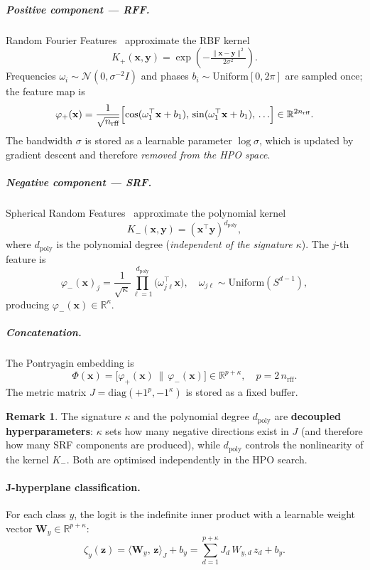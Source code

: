 \documentclass[12pt,a4paper]{article}
\newcommand{\R}{\mathbb{R}}
\newcommand{\kap}{\kappa}
\newcommand{\Jprod}[2]{\langle #1,\, #2 \rangle_J}
\newcommand{\phipos}{\varphi_+}
\newcommand{\phineg}{\varphi_-}
\newcommand{\dpoly}{d_{\mathrm{poly}}}
\theoremstyle{definition}
\newtheorem{remark}{Remark}
\begin{document}
\subparagraph{Positive component — RFF.}
Random Fourier Features~\cite{rahimi2007} approximate the RBF kernel
\[
  K_+(\mathbf{x}, \mathbf{y}) = \exp\!\left(-\tfrac{\|\mathbf{x}-\mathbf{y}\|^2}{2\sigma^2}\right).
\]
Frequencies $\omega_i \sim \mathcal{N}(0, \sigma^{-2} I)$ and phases
$b_i \sim \mathrm{Uniform}[0, 2\pi]$ are sampled once; the feature map is
\[
  \phipos(\mathbf{x}) = \frac{1}{\sqrt{n_{\text{rff}}}}
  \Bigl[\cos(\omega_1^\top \mathbf{x} + b_1),\, \sin(\omega_1^\top \mathbf{x} + b_1),\,
        \ldots\Bigr]
  \in \R^{2 n_{\text{rff}}}.
\]
The bandwidth $\sigma$ is stored as a learnable parameter $\log\sigma$, which
is updated by gradient descent and therefore \emph{removed from the HPO
space}.

\subparagraph{Negative component — SRF.}
Spherical Random Features~\cite{pennington2015} approximate the polynomial
kernel
\[
  K_-(\mathbf{x}, \mathbf{y}) = (\mathbf{x}^\top \mathbf{y})^{\dpoly},
\]
where $\dpoly$ is the polynomial degree (\emph{independent of the signature
$\kap$}).  The $j$-th feature is
\[
  \phineg(\mathbf{x})_j = \frac{1}{\sqrt{\kap}}
  \prod_{\ell=1}^{\dpoly} \bigl(\omega_{j\ell}^\top \mathbf{x}\bigr),
  \quad
  \omega_{j\ell} \sim \mathrm{Uniform}(S^{d-1}),
\]
producing $\phineg(\mathbf{x}) \in \R^\kap$.

\subparagraph{Concatenation.}
The Pontryagin embedding is
\[
  \Phi(\mathbf{x})
  = \bigl[\phipos(\mathbf{x})\,\|\,\phineg(\mathbf{x})\bigr]
  \in \R^{p + \kap},
  \quad p = 2\,n_{\text{rff}}.
\]
The metric matrix $J = \mathrm{diag}(+1^p, -1^\kap)$ is stored as a fixed
buffer.

\begin{remark}
  The signature $\kap$ and the polynomial degree $\dpoly$ are
  \textbf{decoupled hyperparameters}: $\kap$ sets how many negative
  directions exist in $J$ (and therefore how many SRF components are
  produced), while $\dpoly$ controls the nonlinearity of the kernel $K_-$.
  Both are optimised independently in the HPO search.
\end{remark}

\paragraph{J-hyperplane classification.}
For each class $y$, the logit is the indefinite inner product with a learnable
weight vector $\mathbf{W}_y \in \R^{p+\kap}$:
\[
  \zeta_y(\mathbf{z}) = \Jprod{\mathbf{W}_y}{\mathbf{z}} + b_y
  = \sum_{d=1}^{p+\kap} J_d\, W_{y,d}\, z_d + b_y.
\]
\end{document}
